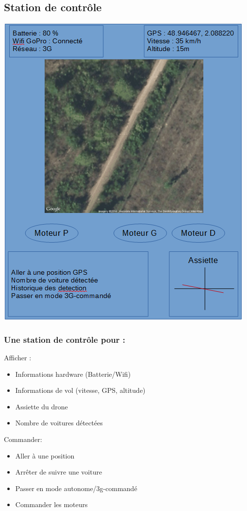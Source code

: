 \documentclass[transparent]{beamer}
\begin{document}
\subsection{Station de contrôle}

\begin{frame}
	\begin{center}
 	\includegraphics[height=0.95\textheight]{images/station.png} 
	\end{center}
\end{frame}

\begin{frame}
\frametitle{Une station de contrôle pour :}
	\begin{block}{Afficher :}
			\begin{itemize}
				\item Informations hardware (Batterie/Wifi)
				\item Informations de vol (vitesse, GPS, altitude)
				\item Assiette du drone
				\item Nombre de voitures détectées
			\end{itemize}
	\end{block}
	\begin{block}{Commander:}
			\begin{itemize}
				\item Aller à une position
				\item Arrêter de suivre une voiture
				\item Passer en mode autonome/3g-commandé
				\item Commander les moteurs
			\end{itemize}
	\end{block}
\end{frame}
\end{document}
